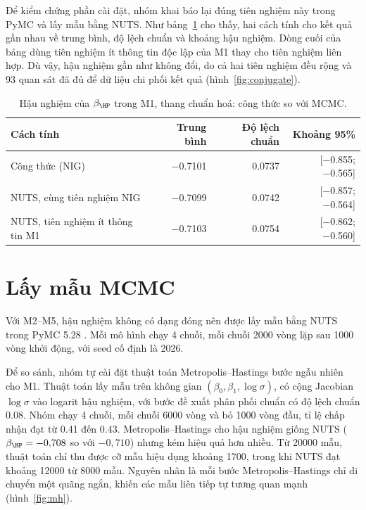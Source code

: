 \documentclass[12pt,a4paper]{report}
\begin{document}
Để kiểm chứng phần cài đặt, nhóm khai báo lại đúng tiên nghiệm này trong PyMC và
lấy mẫu bằng NUTS. Như bảng~\ref{tab:conjugate} cho thấy, hai cách tính cho kết
quả gần nhau về trung bình, độ lệch chuẩn và khoảng hậu nghiệm. Dòng cuối của bảng dùng tiên nghiệm
ít thông tin độc lập của M1 thay cho tiên nghiệm liên hợp. Dù vậy, hậu nghiệm gần
như không đổi, do cả hai tiên nghiệm đều rộng và 93 quan sát đã đủ để dữ liệu chi
phối kết quả (hình~\ref{fig:conjugate}).

\begin{table}[tp]
  \centering
  \caption{Hậu nghiệm của $\beta_{\HP}$ trong M1, thang chuẩn hoá: công thức so
    với MCMC.}
  \label{tab:conjugate}
  \begin{tabular}{lrrr}
    \toprule
    Cách tính & Trung bình & Độ lệch chuẩn & Khoảng 95\% \\
    \midrule
    Công thức (NIG)                   & \num{-0.7101} & \num{0.0737} & [\num{-0.855}; \num{-0.565}] \\
    NUTS, cùng tiên nghiệm NIG        & \num{-0.7099} & \num{0.0742} & [\num{-0.857}; \num{-0.564}] \\
    NUTS, tiên nghiệm ít thông tin M1 & \num{-0.7103} & \num{0.0754} & [\num{-0.862}; \num{-0.560}] \\
    \bottomrule
  \end{tabular}
\end{table}


\section{Lấy mẫu MCMC}
\label{sec:mcmc}

Với M2--M5, hậu nghiệm không có dạng đóng nên được lấy mẫu bằng NUTS trong PyMC
5.28 \cite{abrilpla2023pymc}. Mỗi mô hình chạy 4 chuỗi, mỗi chuỗi \num{2000}
vòng lặp sau \num{1000} vòng khởi động, với seed cố định là 2026.

Để so sánh, nhóm tự cài đặt thuật toán Metropolis--Hastings bước ngẫu nhiên cho
M1. Thuật toán lấy mẫu trên không gian $(\beta_0, \beta_1, \log\sigma)$, có cộng
Jacobian $\log\sigma$ vào logarit hậu nghiệm, với bước đề xuất phân phối chuẩn
có độ lệch chuẩn \num{0.08}. Nhóm chạy 4 chuỗi, mỗi chuỗi \num{6000} vòng và bỏ
\num{1000} vòng đầu, tỉ lệ chấp nhận đạt từ \num{0.41} đến \num{0.43}.
Metropolis--Hastings cho hậu nghiệm giống NUTS ($\beta_{\HP} = -0{,}708$ so với
$-0{,}710$) nhưng kém hiệu quả hơn nhiều. Từ \num{20000} mẫu, thuật toán chỉ thu
được cỡ mẫu hiệu dụng khoảng \num{1700}, trong khi NUTS đạt khoảng \num{12000}
từ \num{8000} mẫu. Nguyên nhân là mỗi bước Metropolis--Hastings chỉ di chuyển một
quãng ngắn, khiến các mẫu liên tiếp tự tương quan mạnh (hình~\ref{fig:mh}).
\end{document}
